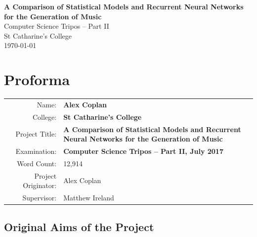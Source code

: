 \documentclass[12pt,a4paper,twoside,openright]{report}
\begin{document}
\cleanlookdateon


\pagestyle{empty}


\vspace*{60mm}
\begin{center}
\Huge
\textbf{A Comparison of Statistical Models and Recurrent Neural Networks for the
Generation of Music} \\[5mm]
Computer Science Tripos -- Part II \\[5mm]
St Catharine's College \\[5mm]
\today  %
\end{center}


\pagestyle{plain}

\chapter*{Proforma}

{\large
\begin{tabular}{r p{10.5cm}}
Name:               & \bf Alex Coplan                       \\
College:            & \bf St Catharine's College                     \\
Project Title:      & \bf A Comparison of Statistical Models and Recurrent
Neural Networks for the \newline Generation of Music \\
Examination:        & \bf Computer Science Tripos -- Part II, July 2017  \\
Word Count:         & 12,914 \\
Project Originator: & Alex Coplan \\
Supervisor:         & Matthew Ireland                    \\ 
\end{tabular}
}


\section*{Original Aims of the Project}
\end{document}
